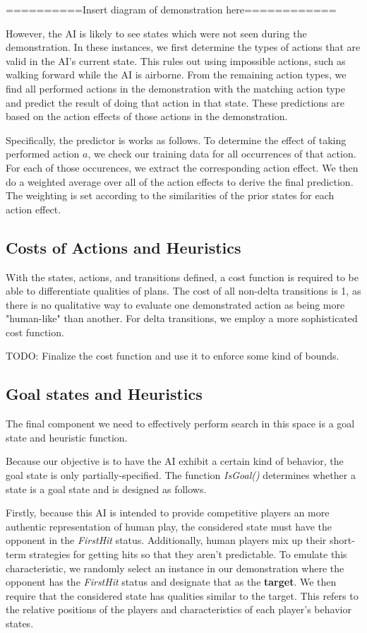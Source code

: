 \documentclass{article}
\begin{document}
==========Insert diagram of demonstration here============

However, the AI is likely to see states which were not seen during the demonstration. In these instances, we first determine the types of actions that are valid in the AI's current state. This rules out using impossible actions, such as walking forward while the AI is airborne. From the remaining action types, we find all performed actions in the demonstration with the matching action type and predict the result of doing that action in that state. These predictions are based on the action effects of those actions in the demonstration.

Specifically, the predictor is works as follows. To determine the effect of taking performed action $a$, we check our training data for all occurrences of that action. For each of those occurences, we extract the corresponding action effect. We then do a weighted average over all of the action effects to derive the final prediction. The weighting is set according to the similarities of the prior states for each action effect.

\subsection{Costs of Actions and Heuristics}
With the states, actions, and transitions defined, a cost function is required to be able to differentiate qualities of plans. The cost of all non-delta transitions is 1, as there is no qualitative way to evaluate one demonstrated action as being more "human-like" than another. For delta transitions, we employ a more sophisticated cost function.

TODO: Finalize the cost function and use it to enforce some kind of bounds.


\subsection{Goal states and Heuristics}
The final component we need to effectively perform search in this space is a goal state and heuristic function. 

Because our objective is to have the AI exhibit a certain kind of behavior, the goal state is only partially-specified. The function \textit{IsGoal()} determines whether a state is a goal state and is designed as follows.
 
Firstly, because this AI is intended to provide competitive players an more authentic representation of human play, the considered state must have the opponent in the \textit{FirstHit} status. Additionally, human players mix up their short-term strategies for getting hits so that they aren't predictable. To emulate this characteristic, we randomly select an instance in our demonstration where the opponent has the \textit{FirstHit} status and designate that as the \textbf{target}. We then require that the considered state has qualities similar to the target. This refers to the relative positions of the players and characteristics of each player's behavior states. 
\end{document}
